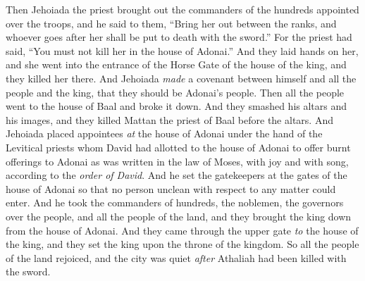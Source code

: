 \begin{biblechapter}
\verse Then Jehoiada the priest brought out the commanders of the hundreds appointed over the troops, and he said to them, “Bring her out between the ranks, and whoever goes after her shall be put to death with the sword.” For the priest had said, “You must not kill her in the house of Adonai.”
\verse And they laid hands on her, and she went into the entrance of the Horse Gate of the house of the king, and they killed her there.
\verse And Jehoiada \textit{made} a covenant between himself and all the people and the king, that they should be Adonai’s people.
\verse Then all the people went to the house of Baal and broke it down. And they smashed his altars and his images, and they killed Mattan the priest of Baal before the altars.
\verse And Jehoiada placed appointees \textit{at} the house of Adonai under the hand of the Levitical priests whom David had allotted to the house of Adonai to offer burnt offerings to Adonai as was written in the law of Moses, with joy and with song, according to the \textit{order of David}.
\verse And he set the gatekeepers at the gates of the house of Adonai so that no person unclean with respect to any matter could enter.
\verse And he took the commanders of hundreds, the noblemen, the governors over the people, and all the people of the land, and they brought the king down from the house of Adonai. And they came through the upper gate \textit{to} the house of the king, and they set the king upon the throne of the kingdom.
\verse So all the people of the land rejoiced, and the city was quiet \textit{after} Athaliah had been killed with the sword.
\end{biblechapter}

